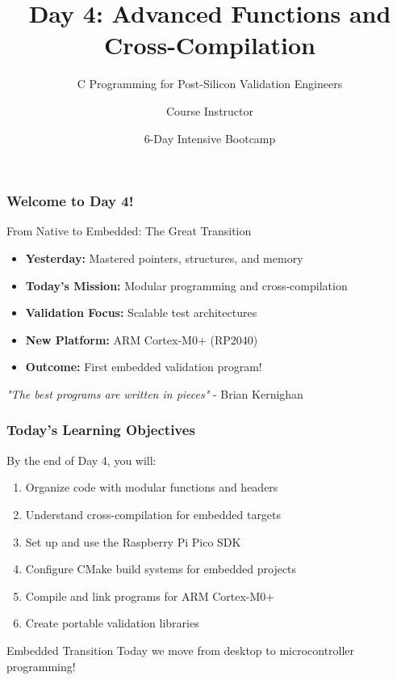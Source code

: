 \documentclass{beamer}
\title{Day 4: Advanced Functions and Cross-Compilation}
\subtitle{C Programming for Post-Silicon Validation Engineers}
\author{Course Instructor}
\date{6-Day Intensive Bootcamp}
\institute{Post-Silicon Validation Training Program}
\begin{document}
\frame{\titlepage}

\begin{frame}
\frametitle{Welcome to Day 4!}
\begin{center}
\Large From Native to Embedded: The Great Transition
\end{center}

\begin{itemize}
    \item \textbf{Yesterday:} Mastered pointers, structures, and memory
    \item \textbf{Today's Mission:} Modular programming and cross-compilation
    \item \textbf{Validation Focus:} Scalable test architectures
    \item \textbf{New Platform:} ARM Cortex-M0+ (RP2040)
    \item \textbf{Outcome:} First embedded validation program!
\end{itemize}

\vspace{0.5cm}
\begin{center}
\textit{"The best programs are written in pieces"} - Brian Kernighan
\end{center}
\end{frame}

\begin{frame}
\frametitle{Today's Learning Objectives}
By the end of Day 4, you will:

\begin{enumerate}
    \item Organize code with modular functions and headers
    \item Understand cross-compilation for embedded targets
    \item Set up and use the Raspberry Pi Pico SDK
    \item Configure CMake build systems for embedded projects
    \item Compile and link programs for ARM Cortex-M0+
    \item Create portable validation libraries
\end{enumerate}

\vspace{0.5cm}
\begin{alertblock}{Embedded Transition}
Today we move from desktop to microcontroller programming!
\end{alertblock}
\end{frame}
\end{document}
